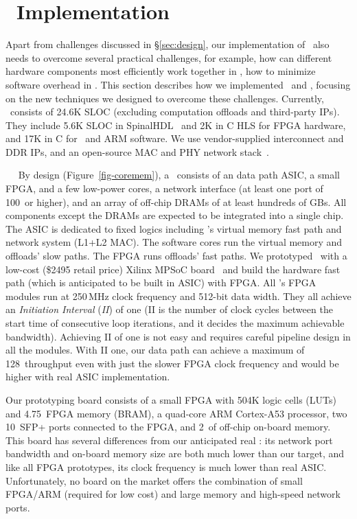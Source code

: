 \section{\sys\ Implementation}
\label{sec:impl}

Apart from challenges discussed in \S\ref{sec:design}, our implementation of \sys\ also needs to overcome several practical challenges, for example, how can different hardware components most efficiently work together in \sysboard, how to minimize software overhead in \syslib. 
This section describes how we implemented \sysboard\ and \syslib, focusing on the new techniques we designed to overcome these challenges.
Currently, \sys\ consists of 24.6K SLOC (excluding computation offloads and third-party IPs).
They include 5.6K SLOC in SpinalHDL~\cite{SpinalHDL} and 2K in C HLS for FPGA hardware, and 17K in C for \syslib\ and ARM software.
We use vendor-supplied interconnect and DDR IPs, and an open-source MAC and PHY network stack~\cite{Corundum-FCCM20}.

~~
By design (Figure~\ref{fig-coremem}), a \sysboard\ consists of an data path ASIC, a small FPGA, and a few low-power cores,
a network interface (at least one port of 100\Gbps\ or higher), and an array of off-chip DRAMs of at least hundreds of GBs.
All components except the DRAMs are expected to be integrated into a single chip.
The ASIC is dedicated to fixed logics including \sys's virtual memory fast path and network system (L1+L2 MAC).
The software cores run the virtual memory and offloads' slow paths.
The FPGA runs offloads' fast paths.
\fi
We prototyped \sysboard\ with a low-cost (\$2495 retail price) Xilinx MPSoC board~\cite{ZCU106} and build the hardware fast path (which is anticipated to be built in ASIC) with FPGA.
All \sys's FPGA modules run at 250\,MHz clock frequency and 512-bit data width.
They all %
achieve an {\em Initiation Interval} ({\em II}) of one
(II is the number of clock cycles between the start time
of consecutive loop iterations, and it decides the maximum
achievable bandwidth). Achieving II of one is not easy and
requires careful pipeline design in all the modules. With II one, our data path can
achieve a maximum of 128\Gbps\ throughput even with just the slower FPGA clock frequency and would be higher with real ASIC implementation.

Our prototyping board consists of a small FPGA with 504K logic cells (LUTs) and 4.75\MB\ FPGA memory (BRAM),
a quad-core ARM Cortex-A53 processor,
two 10\Gbps\ SFP+ ports connected to the FPGA, 
and 2\GB\ of off-chip on-board memory.
This board has several differences from our anticipated real \sysboard:
its network port bandwidth and on-board memory size are both much lower than our target,
and like all FPGA prototypes, its clock frequency is much lower than real ASIC.
Unfortunately, no board on the market offers the combination of small FPGA/ARM (required for low cost) 
and large memory and high-speed network ports. %

